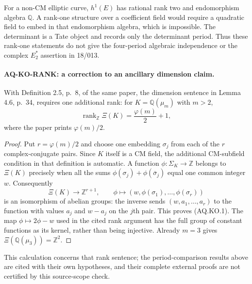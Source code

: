 \documentclass[11pt,a4paper]{article}
\theoremstyle{definition}\newtheorem{definition}[theorem]{Definition}
\theoremstyle{remark}\newtheorem{remark}[theorem]{Remark}
\begin{document}
For a non-CM elliptic curve, $h^1(E)$ has rational rank two
and endomorphism algebra $\mathbb Q$.  A rank-one structure
over a coefficient field would require a quadratic field to
embed in that endomorphism algebra, which is impossible.
The determinant is a Tate object and records only the
determinant period.  Thus these rank-one statements do not
give the four-period algebraic independence or the
complex $E_2^*$ assertion in 18/013.

\paragraph{AQ-KO-RANK: a correction to an ancillary dimension claim.}
With Definition 2.5, p.~8, of the same paper, the dimension
sentence in Lemma 4.6, p.~34, requires one additional rank:
for $K=\mathbb Q(\mu_m)$ with $m>2$,
\[
 \operatorname{rank}_{\mathbb Z}\Xi(K)
       =\frac{\varphi(m)}2+1,
 \tag{AQ.KO.1}
\]
where the paper prints $\varphi(m)/2$.
\begin{proof}
Put $r=\varphi(m)/2$ and choose one embedding
$\sigma_j$ from each of the $r$ complex-conjugate pairs.
Since $K$ itself is a CM field, the additional CM-subfield
condition in that definition is automatic.
A function $\phi:\Sigma_K\to\mathbb Z$ belongs to
$\Xi(K)$ precisely when all the sums
$\phi(\sigma_j)+\phi(\overline\sigma_j)$ equal
one common integer $w$.
Consequently
\[
 \Xi(K)\longrightarrow\mathbb Z^{r+1},\qquad
 \phi\longmapsto(w,\phi(\sigma_1),\ldots,\phi(\sigma_r))
\]
is an isomorphism of abelian groups: the inverse sends
$(w,a_1,\ldots,a_r)$ to the function with values
$a_j$ and $w-a_j$ on the $j$th pair.
This proves (AQ.KO.1).  The map
$\phi\mapsto2\phi-w$ used in the cited rank argument
has the full group of constant functions as its kernel,
rather than being injective.  Already $m=3$ gives
$\Xi(\mathbb Q(\mu_3))=\mathbb Z^2$.
\end{proof}
This calculation concerns that rank sentence; the
period-comparison results above are cited with their
own hypotheses, and their complete external proofs
are not certified by this source-scope check.
\end{document}
